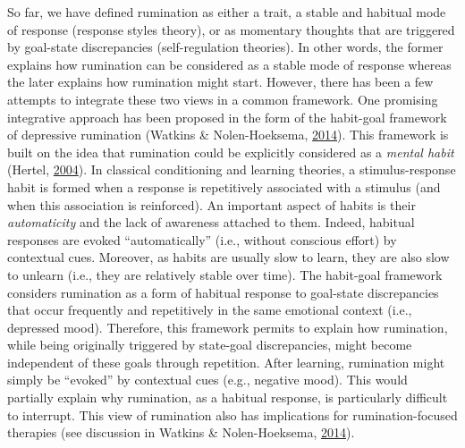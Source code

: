\documentclass[a4paper,12pt,twoside,onecolumn,openright,final,oldfontcommands]{memoir}
\begin{document}
So far, we have defined rumination as either a trait, a stable and habitual mode of response (response styles theory), or as momentary thoughts that are triggered by goal-state discrepancies (self-regulation theories). In other words, the former explains how rumination can be considered as a stable mode of response whereas the later explains how rumination might start. However, there has been a few attempts to integrate these two views in a common framework. One promising integrative approach has been proposed in the form of the habit-goal framework of depressive rumination (Watkins \& Nolen-Hoeksema, \protect\hyperlink{ref-watkins_habit-goal_2014}{2014}). This framework is built on the idea that rumination could be explicitly considered as a \emph{mental habit} (Hertel, \protect\hyperlink{ref-hertel_memory_2004}{2004}). In classical conditioning and learning theories, a stimulus-response habit is formed when a response is repetitively associated with a stimulus (and when this association is reinforced). An important aspect of habits is their \emph{automaticity} and the lack of awareness attached to them. Indeed, habitual responses are evoked \enquote{automatically} (i.e., without conscious effort) by contextual cues. Moreover, as habits are usually slow to learn, they are also slow to unlearn (i.e., they are relatively stable over time). The habit-goal framework considers rumination as a form of habitual response to goal-state discrepancies that occur frequently and repetitively in the same emotional context (i.e., depressed mood). Therefore, this framework permits to explain how rumination, while being originally triggered by state-goal discrepancies, might become independent of these goals through repetition. After learning, rumination might simply be \enquote{evoked} by contextual cues (e.g., negative mood). This would partially explain why rumination, as a habitual response, is particularly difficult to interrupt. This view of rumination also has implications for rumination-focused therapies (see discussion in Watkins \& Nolen-Hoeksema, \protect\hyperlink{ref-watkins_habit-goal_2014}{2014}).
\end{document}
